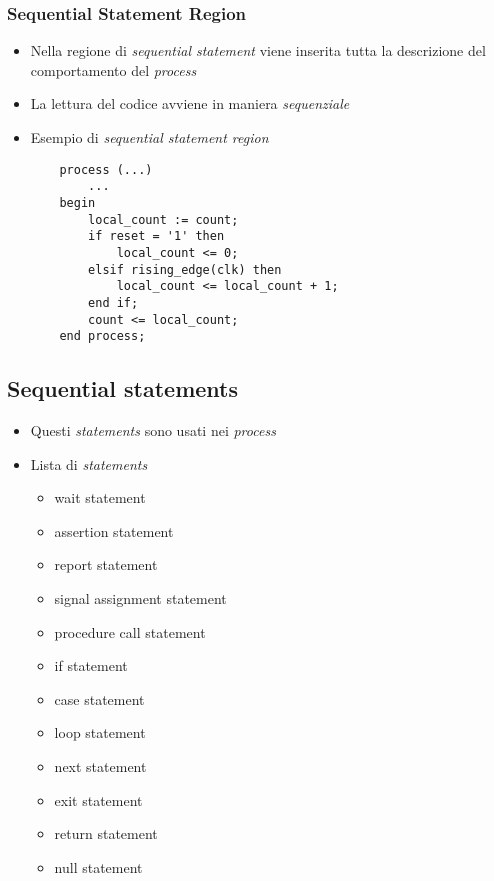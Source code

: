\documentclass{article}
\begin{document}
\subsubsection{Sequential Statement Region}
\begin{itemize}
	\item Nella regione di \textit{sequential statement} viene inserita tutta la descrizione del comportamento del \textit{process}
	\item La lettura del codice avviene in maniera \textit{sequenziale}
	\item Esempio di \textit{sequential statement region}
		\begin{verbatim}
    process (...)
        ...
    begin
        local_count := count;
        if reset = '1' then
            local_count <= 0;
        elsif rising_edge(clk) then
            local_count <= local_count + 1;
        end if;
        count <= local_count;
    end process;
	      \end{verbatim}
\end{itemize}
\subsection{Sequential statements}
\begin{itemize}
	\item Questi \textit{statements} sono usati nei \textit{process}
	\item Lista di \textit{statements}
	      \begin{itemize}
	      	\item wait statement
	      	\item assertion statement
	      	\item report statement
	      	\item signal assignment statement
	      	\item procedure call statement
	      	\item if statement
	      	\item case statement
	      	\item loop statement
	      	\item next statement
	      	\item exit statement
	      	\item return statement
	      	\item null statement
	      \end{itemize}
\end{itemize}
\end{document}
